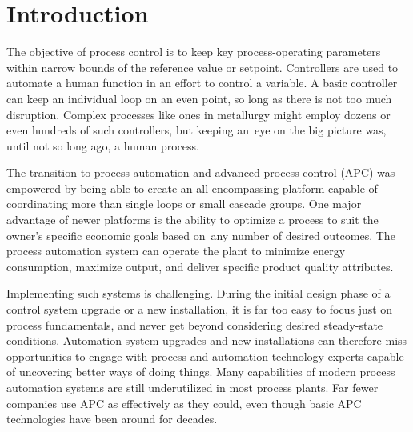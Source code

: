 \setcounter{page}{1}
\setcounter{equation}{0}
\setcounter{figure}{0}
\setcounter{table}{0}

\section{Introduction}

The objective of process control is to keep key process-operating parameters within narrow bounds of the reference value or setpoint. Controllers are used to automate a human function in an effort to control a variable. A basic controller can keep an individual loop on an even point, so long as there is not too much disruption. Complex processes like ones in metallurgy might employ dozens or even hundreds of such controllers, but keeping an~eye on the big picture was, until not so long ago, a human process.

The transition to process automation and advanced process control (APC) was empowered by being able to create an all-encompassing platform capable of coordinating more than single loops or small cascade groups. One major advantage of newer platforms is the ability to optimize a process to suit the owner’s specific economic goals based on~any number of desired outcomes. The process automation system can operate the plant to minimize energy consumption, maximize output, and deliver specific product quality attributes.

Implementing such systems is challenging. During the initial design phase of a control system upgrade or a new installation, it is far too easy to focus just on process fundamentals, and never get beyond considering desired steady-state conditions. Automation system upgrades and new installations can therefore miss opportunities to engage with process and automation technology experts capable of uncovering better ways of doing things. Many capabilities of modern process automation systems are still underutilized in most process plants. Far fewer companies use APC as effectively as they could, even though basic APC technologies have been around for decades.

